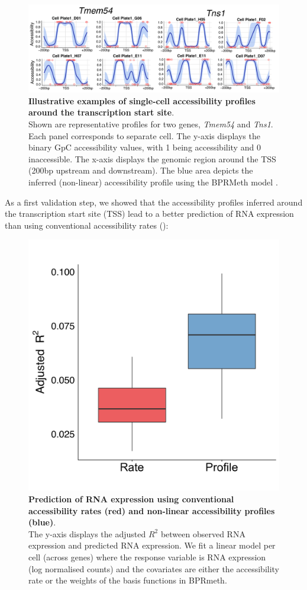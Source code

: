 \begin{figure}[H]
	\centering
	\includegraphics[width=0.9\linewidth]{scNMT_profiles_examples}
	\caption[]{\textbf{Illustrative examples of single-cell accessibility profiles around the transcription start site}.\\
	Shown are representative profiles for two genes, \textit{Tmem54} and \textit{Tns1}. Each panel corresponds to separate cell. The y-axis displays the binary GpC accessibility values, with 1 being accessibility and 0 inaccessible. The x-axis displays the genomic region around the TSS (200bp upstream and downstream). The blue area depicts the inferred (non-linear) accessibility profile using the BPRMeth model \cite{Kapourani2018}.}
	\label{fig:scnmt_profiles_examples}
\end{figure}

As a first validation step, we showed that the accessibility profiles inferred around the transcription start site (TSS) lead to a better prediction of RNA expression than using conventional accessibility rates ():

\begin{figure}[H]
	\centering
	\includegraphics[width=0.65\linewidth]{scNMT_profiles_prediction}
	\caption[]{\textbf{Prediction of RNA expression using conventional accessibility rates (red) and non-linear accessibility profiles (blue)}.\\
	The y-axis displays the adjusted $R^2$ between observed RNA expression and predicted RNA expression. We fit a linear model per cell (across genes) where the response variable is RNA expression (log normalised counts) and the covariates are either the accessibility rate or the weights of the basis functions in BPRmeth.}
	\label{fig:scnmt_profiles_prediction}
\end{figure}

